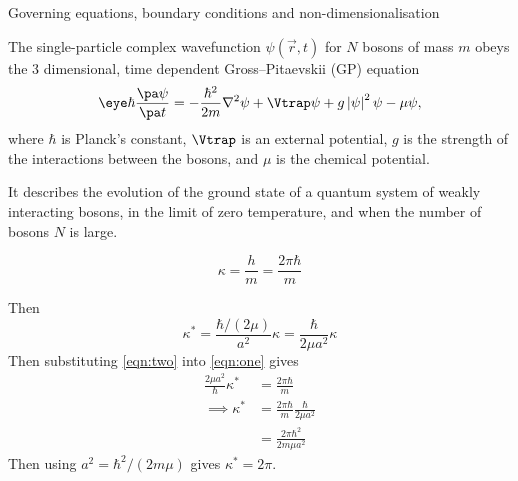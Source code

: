 
\begin{chapter}{\label{cha:equations}Governing equations, boundary conditions
  and non-dimensionalisation}

  The single-particle complex wavefunction $\psi(\vec{r}, t)$ for $N$ bosons of
  mass $m$ obeys the 3 dimensional, time dependent Gross--Pitaevskii (GP)
  equation \citep{Gross61,Pitaevskii61}
  \begin{equation}
    \eye \hbar \frac{\pa \psi}{\pa t} = -\frac{\hbar^{2}}{2m} \nabla^{2} \psi +
    \Vtrap \psi + g \left|\psi\right|^{2} \psi - \mu \psi,
  \end{equation}
  where $\hbar$ is Planck's constant, $\Vtrap$ is an external potential, $g$ is
  the strength of the interactions between the bosons, and $\mu$ is the
  chemical potential.

  It describes the evolution of the ground state of a quantum system of weakly
  interacting bosons, in the limit of zero temperature, and when the number of
  bosons $N$ is large.

  \begin{equation}
    \kappa = \frac{h}{m} = \frac{2\pi\hbar}{m}
    \label{eqn:one}
  \end{equation}

  \noindent Then
  \begin{equation}
    \kappa^{*} = \frac{\hbar/(2\mu)}{a^{2}}\kappa = \frac{\hbar}{2\mu
      a^{2}}\kappa
    \label{eqn:two}
  \end{equation}
  Then substituting \eqref{eqn:two} into \eqref{eqn:one} gives
  \begin{equation*}
    \begin{aligned}
      \frac{2\mu a^{2}}{\hbar}\kappa^{*} &= \frac{2\pi\hbar}{m} \\
      \implies \kappa^{*} &= \frac{2\pi\hbar}{m} \frac{\hbar}{2\mu a^{2}} \\
      &= \frac{2\pi\hbar^{2}}{2m\mu a^{2}}
    \end{aligned}
  \end{equation*}
  Then using $a^{2} = \hbar^{2}/(2m\mu)$ gives $\kappa^{*} = 2\pi$.
\end{chapter}
